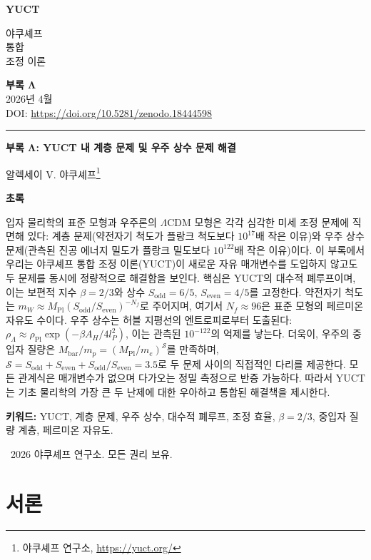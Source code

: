 \documentclass[11pt,a4paper]{article}
\theoremstyle{remark}
\newcommand{\makeheader}{%
	\noindent
	\begin{minipage}{0.17\textwidth}
		\raggedright
		{\sffamily\bfseries\color{skyblue}\fontsize{46}{46}\selectfont YUCT}%
	\end{minipage}%
	\hspace{30pt}
	\begin{minipage}{0.32\textwidth}
		\raggedright
		{\sffamily\fontsize{11}{13}\selectfont 야쿠셰프\\ 통합\\ 조정 이론}%
	\end{minipage}%
	\hfill
	\begin{minipage}{0.38\textwidth}
		\raggedleft
		{\sffamily\bfseries 부록 Λ}\\
		{\sffamily 2026년 4월}\\
		{\sffamily\footnotesize DOI: \url{https://doi.org/10.5281/zenodo.18444598}}%
	\end{minipage}
	\par\vspace{5pt}
	\noindent\textcolor{gold}{\rule{\textwidth}{1.6pt}}
	\par\vspace{0pt}
}
\begin{document}
	\renewcommand{\thepage}{\arabic{page}}
	\thispagestyle{firstpage}
	\makeheader
	
	\vspace{0cm}
	{\LARGE\bfseries 부록 Λ: YUCT 내 계층 문제 및 우주 상수 문제 해결 \par}
	\vspace{0.2cm}
	
	{\large 알렉세이 V. 야쿠셰프\footnote{야쿠셰프 연구소, \url{https://yuct.org/}}} \\
	\vspace{0.0cm}
	
	{\color{darkblue}\textbf{\LARGE 초록}} \par
	{\large
		\noindent
		입자 물리학의 표준 모형과 우주론의 \(\Lambda\)CDM 모형은 각각 심각한 미세 조정 문제에 직면해 있다: 계층 문제(약전자기 척도가 플랑크 척도보다 \(10^{17}\)배 작은 이유)와 우주 상수 문제(관측된 진공 에너지 밀도가 플랑크 밀도보다 \(10^{122}\)배 작은 이유)이다. 이 부록에서 우리는 야쿠셰프 통합 조정 이론(YUCT)이 새로운 자유 매개변수를 도입하지 않고도 두 문제를 동시에 정량적으로 해결함을 보인다. 핵심은 YUCT의 대수적 폐루프이며, 이는 보편적 지수 \(\beta = 2/3\)와 상수 \(S_{\mathrm{odd}} = 6/5\), \(S_{\mathrm{even}} = 4/5\)를 고정한다. 약전자기 척도는 \(m_W \approx M_{\mathrm{Pl}} (S_{\mathrm{odd}}/S_{\mathrm{even}})^{-N_f}\)로 주어지며, 여기서 \(N_f \approx 96\)은 표준 모형의 페르미온 자유도 수이다. 우주 상수는 허블 지평선의 엔트로피로부터 도출된다: \(\rho_\Lambda \approx \rho_{\mathrm{Pl}} \exp(-\beta A_H / 4l_P^2)\), 이는 관측된 \(10^{-122}\)의 억제를 낳는다. 더욱이, 우주의 중입자 질량은 \(M_{\mathrm{bar}}/m_p = (M_{\mathrm{Pl}}/m_e)^{\mathcal{S}}\)를 만족하며, \(\mathcal{S} = S_{\mathrm{odd}} + S_{\mathrm{even}} + S_{\mathrm{odd}}/S_{\mathrm{even}} = 3.5\)로 두 문제 사이의 직접적인 다리를 제공한다. 모든 관계식은 매개변수가 없으며 다가오는 정밀 측정으로 반증 가능하다. 따라서 YUCT는 기초 물리학의 가장 큰 두 난제에 대한 우아하고 통합된 해결책을 제시한다.
	}
	
	\vspace{0.1cm}
	\noindent
	{\color{darkblue}\textbf{키워드:}} YUCT, 계층 문제, 우주 상수, 대수적 폐루프, 조정 효율, \(\beta = 2/3\), 중입자 질량 계층, 페르미온 자유도.
	
	\vspace{0.5cm}
	\noindent
	\textcopyright\ 2026 야쿠셰프 연구소. 모든 권리 보유.
	
	\tableofcontents
	\newpage
	
	\section{서론}
	
\end{document}
